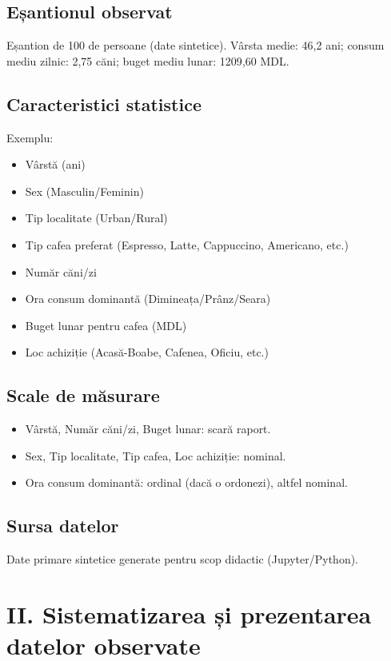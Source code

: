 \documentclass[12pt,a4paper]{report}
\begin{document}
\subsection{Eșantionul observat}
Eșantion de 100 de persoane (date sintetice). Vârsta medie: 46{,}2 ani; consum mediu zilnic: 2{,}75 căni; buget mediu lunar: 1209{,}60 MDL.

\subsection{Caracteristici statistice}
Exemplu:
\begin{itemize}[leftmargin=1.2cm]
  \item Vârstă (ani)
  \item Sex (Masculin/Feminin)
  \item Tip localitate (Urban/Rural)
  \item Tip cafea preferat (Espresso, Latte, Cappuccino, Americano, etc.)
  \item Număr căni/zi
  \item Ora consum dominantă (Dimineața/Prânz/Seara)
  \item Buget lunar pentru cafea (MDL)
  \item Loc achiziție (Acasă-Boabe, Cafenea, Oficiu, etc.)
\end{itemize}

\subsection{Scale de măsurare}
\begin{itemize}[leftmargin=1.2cm]
  \item Vârstă, Număr căni/zi, Buget lunar: scară raport.
  \item Sex, Tip localitate, Tip cafea, Loc achiziție: nominal.
  \item Ora consum dominantă: ordinal (dacă o ordonezi), altfel nominal.
\end{itemize}

\subsection{Sursa datelor}
Date primare sintetice generate pentru scop didactic (Jupyter/Python).

\section*{II. Sistematizarea și prezentarea datelor observate}
\setcounter{section}{2}
\end{document}
